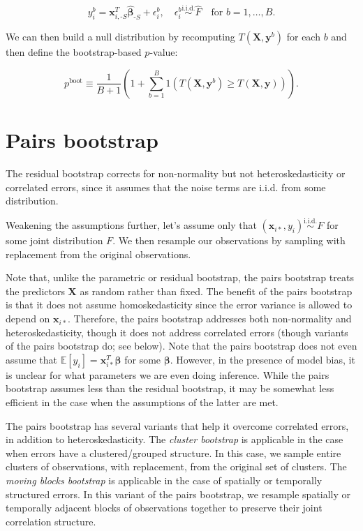 \documentclass[
  11pt,
  letterpaper,
  oneside]{book}
\theoremstyle{definition}
\theoremstyle{plain}
\theoremstyle{plain}
\theoremstyle{plain}
\theoremstyle{remark}
\begin{document}
\[
y_i^b = \boldsymbol{x}_{i, \text{-}S}^T \boldsymbol{\widehat{\beta}}_{\text{-}S} + \epsilon_i^b, \quad \epsilon_i^b \overset{\text{i.i.d.}}{\sim} \widehat{F} \quad \text{for } b = 1, \dots, B.
\]

We can then build a null distribution by recomputing
\(T(\boldsymbol{X}, \boldsymbol{y}^b)\) for each \(b\) and then define
the bootstrap-based \(p\)-value:

\[
p^{\text{boot}} \equiv \frac{1}{B+1}\left(1+\sum_{b = 1}^B 1(T(\boldsymbol{X}, \boldsymbol{y}^b) \geq T(\boldsymbol{X}, \boldsymbol{y}))\right).
\]

\hypertarget{sec-pairs-bootstrap}{%
\section{Pairs bootstrap}\label{sec-pairs-bootstrap}}

The residual bootstrap corrects for non-normality but not
heteroskedasticity or correlated errors, since it assumes that the noise
terms are i.i.d. from some distribution.

Weakening the assumptions further, let's assume only that
\((\boldsymbol{x}_{i*}, y_i) \overset{\text{i.i.d.}}{\sim} F\) for some
joint distribution \(F\). We then resample our observations by sampling
with replacement from the original observations.

Note that, unlike the parametric or residual bootstrap, the pairs
bootstrap treats the predictors \(\boldsymbol{X}\) as random rather than
fixed. The benefit of the pairs bootstrap is that it does not assume
homoskedasticity since the error variance is allowed to depend on
\(\boldsymbol{x}_{i*}\). Therefore, the pairs bootstrap addresses both
non-normality and heteroskedasticity, though it does not address
correlated errors (though variants of the pairs bootstrap do; see
below). Note that the pairs bootstrap does not even assume that
\(\mathbb{E}[y_i] = \boldsymbol{x}_{i*}^T \boldsymbol{\beta}\) for some
\(\boldsymbol{\beta}\). However, in the presence of model bias, it is
unclear for what parameters we are even doing inference. While the pairs
bootstrap assumes less than the residual bootstrap, it may be somewhat
less efficient in the case when the assumptions of the latter are met.

The pairs bootstrap has several variants that help it overcome
correlated errors, in addition to heteroskedasticity. The \emph{cluster
bootstrap} is applicable in the case when errors have a
clustered/grouped structure. In this case, we sample entire clusters of
observations, with replacement, from the original set of clusters. The
\emph{moving blocks bootstrap} is applicable in the case of spatially or
temporally structured errors. In this variant of the pairs bootstrap, we
resample spatially or temporally adjacent blocks of observations
together to preserve their joint correlation structure.
\end{document}
